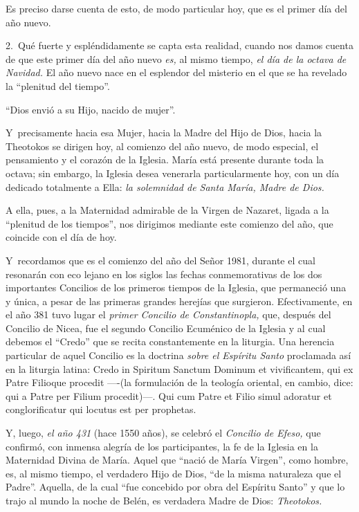 Es preciso darse cuenta de esto, de modo particular hoy, que es el
primer día del año nuevo.

2.~Qué fuerte y espléndidamente se capta esta realidad, cuando nos damos
cuenta de que este primer día del año nuevo \emph{es,} al mismo tiempo,
\emph{el día de la octava de Navidad.} El año nuevo nace en el esplendor
del misterio en el que se ha revelado la ``plenitud del tiempo''.

``Dios envió a su Hijo, nacido de mujer''.

Y~precisamente hacia esa Mujer, hacia la Madre del Hijo de Dios, hacia
la Theotokos se dirigen hoy, al comienzo del año nuevo, de modo
especial, el pensamiento y el corazón de la Iglesia. María está presente
durante toda la octava; sin embargo, la Iglesia desea venerarla
particularmente hoy, con un día dedicado totalmente a Ella: \emph{la
	solemnidad de Santa María, Madre de Dios.}

A ella, pues, a la Maternidad admirable de la Virgen de Nazaret, ligada
a la ``plenitud de los tiempos'', nos dirigimos mediante este comienzo
del año, que coincide con el día de hoy.

Y~recordamos que es el comienzo del año del Señor 1981, durante el cual
resonarán con eco lejano en los siglos las fechas conmemorativas de los
dos importantes Concilios de los primeros tiempos de la Iglesia, que
permaneció una y única, a pesar de las primeras grandes herejías que
surgieron. Efectivamente, en el año 381 tuvo lugar el \emph{primer
	Concilio de Constantinopla,} que, después del Concilio de Nicea, fue el
segundo Concilio Ecuménico de la Iglesia y al cual debemos el ``Credo''
que se recita constantemente en la liturgia. Una herencia particular de
aquel Concilio es la doctrina \emph{sobre el Espíritu Santo} proclamada
así en la liturgia latina: Credo in Spiritum Sanctum Dominum et
vivificantem, qui ex Patre Filioque procedit ----(la formulación de la
teología oriental, en cambio, dice: qui a Patre per Filium procedit)---.
Qui cum Patre et Filio simul adoratur et conglorificatur qui locutus est
per prophetas.

Y, luego, \emph{el año 431} (hace 1550 años), se celebró el
\emph{Concilio de Efeso,} que confirmó, con inmensa alegría de los
participantes, la fe de la Iglesia en la Maternidad Divina de María.
Aquel que ``nació de María Virgen'', como hombre, es, al mismo tiempo,
el verdadero Hijo de Dios, ``de la misma naturaleza que el Padre''.
Aquella, de la cual ``fue concebido por obra del Espíritu Santo'' y que
lo trajo al mundo la noche de Belén, es verdadera Madre de Dios:
\emph{Theotokos.}

